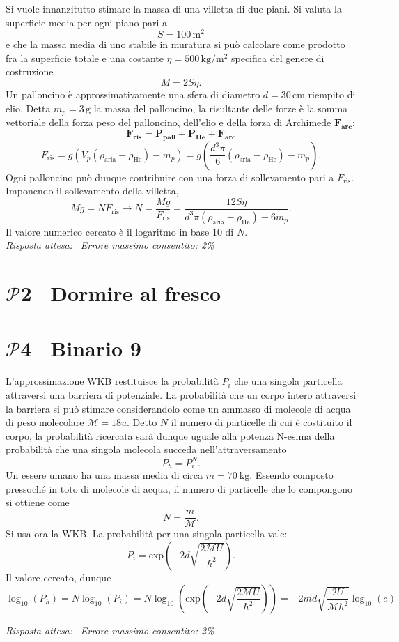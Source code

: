 \documentclass[a4paper,12pt]{article}
\newcommand{\problemtitle}[1]{
  \noindent
  \textbf{\Large #1}\hspace{0.5em}
  \raisebox{0.6ex}{\rule{\linewidth - \widthof{\textbf{\Large #1}} - 0.6em}{0.4pt}}%
}
\begin{document}
Si vuole innanzitutto stimare la massa di una villetta di due piani. Si valuta la superficie media per ogni piano pari a 
\[
S = 100 \, \si{\meter\squared} \tag{1.0}
\]
e che la massa media di uno stabile in muratura si può calcolare come prodotto fra la superficie totale e una costante $\eta = 500 \, \si{\kilo\gram\per\meter\squared}$ specifica del genere di costruzione
\[
M = 2S \eta. \tag{1.1}
\]
Un palloncino è approssimativamente una sfera di diametro $d = 30 \, \si{\centi\meter}$ riempito di elio. Detta $m_p = 3 \, \si{\gram}$ la massa del palloncino, la risultante delle forze è la somma vettoriale della forza peso del palloncino, dell'elio e della forza di Archimede $\mathbf{F_{\text{arc}}}$:
\[
\mathbf{F_{\text{ris}}} = \mathbf{P_{\text{pall}}} + \mathbf{P_{\text{He}}} + \mathbf{F_{\text{arc}}} \tag{1.2}
\]
\[
F_{\text{ris}} = g(V_p(\rho_{\text{aria}} - \rho_{\text{He}}) - m_p) = g(\frac{d^3\pi}{6}(\rho_{\text{aria}} - \rho_{\text{He}}) - m_p). \tag{1.3}
\]
Ogni palloncino può dunque contribuire con una forza di sollevamento pari a $F_{\text{ris}}$. Imponendo il sollevamento della villetta,
\[
Mg = NF_{\text{ris}} \rightarrow N = \frac{Mg}{F_{\text{ris}}} = \frac{12S\eta}{d^3\pi(\rho_{\text{aria}} - \rho_{\text{He}}) - 6m_p}. \tag{1.4}
\]
Il valore numerico cercato è il logaritmo in base 10 di $N$. \\

\textit{Risposta attesa:}  \, \textit{Errore massimo consentito: 2\%}

\section*{\problemtitle{$\mathcal{P}${\small{2}} \ Dormire al fresco}}

\section*{\problemtitle{$\mathcal{P}${\small{4}} \ Binario 9 \textbf{\nicefrac{3}{4}} }}
L'approssimazione WKB restituisce la probabilità $P_i$ che una singola particella attraversi una barriera di potenziale. La probabilità che un corpo intero attraversi la barriera si può stimare considerandolo come un ammasso di molecole di acqua di peso molecolare $\mathcal{M} = 18u$. Detto $N$ il numero di particelle di cui è costituito il corpo, la probabilità ricercata sarà dunque uguale alla potenza N-esima della probabilità che una singola molecola succeda nell'attraversamento
\[
P_h = P_i^N.
\]
Un essere umano ha una massa media di circa $m = \SI{70}{\kilo\gram}$. Essendo composto pressoché in toto di molecole di acqua, il numero di particelle che lo compongono si ottiene come
\[
N = \frac{m}{\mathcal{M}}.
\] 
Si usa ora la WKB. La probabilità per una singola particella vale:
\[
P_i = \text{exp}\left(-2d\sqrt{\frac{2\mathcal{M}U}{\hbar^2}}\right).
\]
Il valore cercato, dunque 
\[
\log_{10}(P_h) = N\log_{10}(P_i) = N\log_{10}\left({\text{exp}\left(-2d\sqrt{\frac{2\mathcal{M}U}{\hbar^2}}\right)}\right) = -2md\sqrt{\frac{2U}{\mathcal{M}\hbar^2}} \log_{10}(e)
\]

\textit{Risposta attesa:}  \, \textit{Errore massimo consentito: 2\%}
\end{document}
